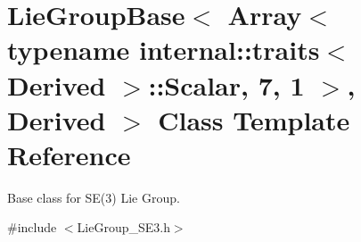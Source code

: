 \hypertarget{class_lie_group_base_3_01_array_3_01typename_01internal_1_1traits_3_01_derived_01_4_1_1_scalar_0d6d4b5459662fc32c7117aee50362fb1}{}\section{Lie\+Group\+Base$<$ Array$<$ typename internal\+:\+:traits$<$ Derived $>$\+:\+:Scalar, 7, 1 $>$, Derived $>$ Class Template Reference}
\label{class_lie_group_base_3_01_array_3_01typename_01internal_1_1traits_3_01_derived_01_4_1_1_scalar_0d6d4b5459662fc32c7117aee50362fb1}


Base class for S\+E(3) Lie Group.  




{\ttfamily \#include $<$Lie\+Group\+\_\+\+S\+E3.\+h$>$}

